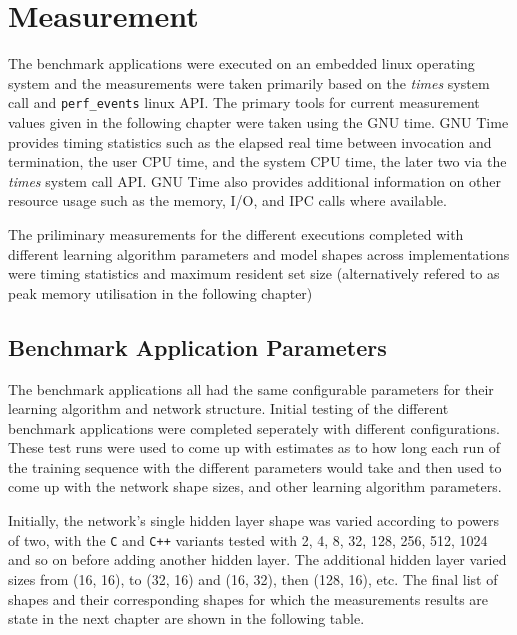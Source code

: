 \chapter{Measurement}

The benchmark applications were executed on an embedded linux operating system and the measurements were taken primarily based on the \textit{times} system call and \texttt{perf\_events} linux API. The primary tools for current measurement values given in the following chapter were taken using the GNU time. GNU Time provides timing statistics such as the elapsed real time between invocation and termination, the user CPU time, and the system CPU time, the later two via the \textit{times} system call API. GNU Time also provides additional information on other resource usage such as the memory, I/O, and IPC calls where available.

The priliminary measurements for the different executions completed with different learning algorithm parameters and model shapes across implementations were timing statistics and maximum resident set size (alternatively refered to as peak memory utilisation in the following chapter)

\section{Benchmark Application Parameters}

The benchmark applications all had the same configurable parameters for their learning algorithm and network structure. Initial testing of the different benchmark applications were completed seperately with different configurations. These test runs were used to come up with estimates as to how long each run of the training sequence with the different parameters would take and then used to come up with the network shape sizes, and other learning algorithm parameters.

Initially, the network's single hidden layer shape was varied according to powers of two, with the \texttt{C} and \texttt{C++} variants tested with 2, 4, 8, 32, 128, 256, 512, 1024 and so on before adding another hidden layer. The additional hidden layer varied sizes from (16, 16), to (32, 16) and (16, 32), then (128, 16), etc. The final list of shapes and their corresponding shapes for which the measurements results are state in the next chapter are shown in the following table.

